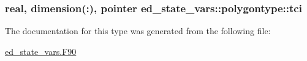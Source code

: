 \subsubsection[{\texorpdfstring{tci}{tci}}]{\setlength{\rightskip}{0pt plus 5cm}real, dimension(\+:), pointer ed\+\_\+state\+\_\+vars\+::polygontype\+::tci}\hypertarget{structed__state__vars_1_1polygontype_a0fe95f22e01ff8f1439d409cf38a2795}{}\label{structed__state__vars_1_1polygontype_a0fe95f22e01ff8f1439d409cf38a2795}


The documentation for this type was generated from the following file\+:\begin{DoxyCompactItemize}
\item 
\hyperlink{ed__state__vars_8_f90}{ed\+\_\+state\+\_\+vars.\+F90}\end{DoxyCompactItemize}
